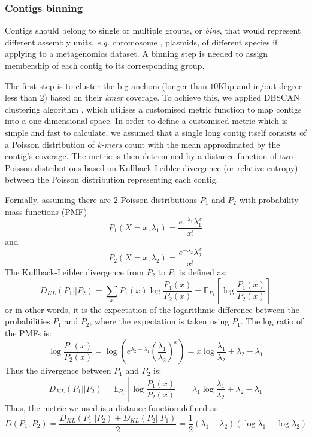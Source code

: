 \documentclass[10pt,letterpaper]{article}
\newcommand{\EG}{\emph{e.g.}}
\begin{document}
\subsubsection*{Contigs binning}
Contigs should belong to single or multiple groups, or \emph{bins}, that would represent different assembly units, \EG{} chromosome , plasmids, of different species if applying to a metagenomics dataset. 
A binning step is needed to assign membership of each contig to its corresponding group. 

The first step is to cluster the big anchors (longer than $10$Kbp and in/out degree less than 2) based on their \emph{kmer} coverage.
To achieve this, we applied DBSCAN clustering algorithm \cite{Ester96adensity-based}, which utilises a customised metric function to map contigs into a one-dimensional space.  In order to 
 define a customised metric which is simple and fast to calculate, we assumed that a single long contig itself consists of a Poisson distribution of \emph{k-mers} count with the mean approximated by the contig's coverage. 
The metric is then determined by a distance function of two Poisson distributions based on Kullback-Leibler divergence (or relative entropy) between the Poisson distribution representing each contig\cite{Kullback1951information}.

Formally, assuming there are 2 Poisson distributions $P_1$ and $P_2$ with probability mass functions (PMF) $$P_1(X=x,\lambda_1)=\frac{e^{-\lambda_1}\lambda_1^x}{x!}$$ and $$P_2(X=x,\lambda_2)=\frac{e^{-\lambda_2}\lambda_2^x}{x!}$$ 
The Kullback-Leibler divergence from $P_2$ to $P_1$ is defined as:
$$D_{KL}(P_1||P_2)=\sum_{x}{P_1(x)\log{\frac{P_1(x)}{P_2(x)}}}=\mathbb{E}_{P_1}[\log{\frac{P_1(x)}{P_2(x)}}]$$
or in other words,  it is the expectation of the logarithmic difference between the probabilities $P_1$ and $P_2$, where the expectation is taken using $P_1$.
The log ratio of the PMFs is:
$$\log{\frac{P_1(x)}{P_2(x)}}=\log{(e^{\lambda_2-\lambda_1}{(\frac{\lambda_1}{\lambda_2})}^x)}=x\log{\frac{\lambda_1}{\lambda_2}}+\lambda_2-\lambda_1$$
Thus the divergence between $P_1$ and $P_2$ is:
$$D_{KL}(P_1||P_2)=\mathbb{E}_{P_1}[\log{\frac{P_1(x)}{P_2(x)}}]=\lambda_1\log{\frac{\lambda_1}{\lambda_2}}+\lambda_2-\lambda_1$$
Thus, the metric we used is a distance function defined as:
$$D(P_1,P_2)=\frac{D_{KL}(P_1||P_2)+D_{KL}(P_2||P_1)}{2}=\frac{1}{2}(\lambda_1-\lambda_2)(\log{\lambda_1}-\log{\lambda_2})$$
\end{document}
